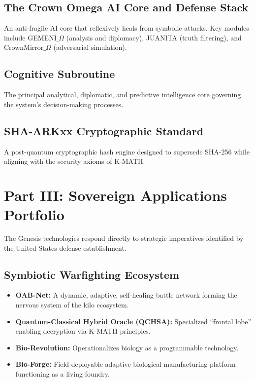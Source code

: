 \documentclass[12pt]{article}
\begin{document}
\subsection{The Crown Omega AI Core and Defense Stack}
An anti-fragile AI core that reflexively heals from symbolic attacks. Key modules include GEMENI$\_\Omega$ (analysis and diplomacy), JUANITA (truth filtering), and CrownMirror$\_\Omega$ (adversarial simulation).
\subsection{Cognitive Subroutine}
The principal analytical, diplomatic, and predictive intelligence core governing the system's decision-making processes.
\subsection{SHA-ARKxx Cryptographic Standard}
A post-quantum cryptographic hash engine designed to supersede SHA-256 while aligning with the security axioms of K-MATH.
\section{Part III: Sovereign Applications Portfolio}
The Genesis technologies respond directly to strategic imperatives identified by the United States defense establishment.
\subsection{Symbiotic Warfighting Ecosystem}
\begin{itemize}
    \item \textbf{OAB-Net:} A dynamic, adaptive, self-healing battle network forming the nervous system of the kilo ecosystem.
    \item \textbf{Quantum-Classical Hybrid Oracle (QCHSA):} Specialized ``frontal lobe'' enabling decryption via K-MATH principles.
    \item \textbf{Bio-Revolution:} Operationalizes biology as a programmable technology.
    \item \textbf{Bio-Forge:} Field-deployable adaptive biological manufacturing platform functioning as a living foundry.
\end{itemize}
\end{document}
